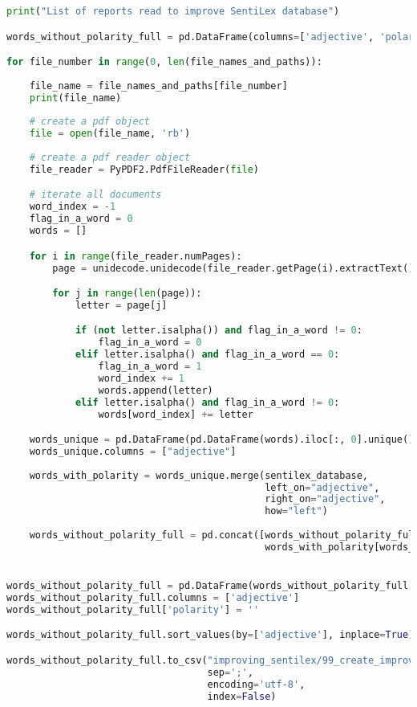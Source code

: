 \begin{lstlisting}[language=Python]
print("List of reports read to improve SentiLex database")

words_without_polarity_full = pd.DataFrame(columns=['adjective', 'polarity'])

for file_number in range(0, len(file_names_and_paths)):
    
    file_name = file_names_and_paths[file_number]
    print(file_name)
    
    # create a pdf object
    file = open(file_name, 'rb')
    
    # create a pdf reader object
    file_reader = PyPDF2.PdfFileReader(file)

    # iterate all documents
    word_index = -1
    flag_in_a_word = 0
    words = []

    for i in range(file_reader.numPages):
        page = unidecode.unidecode(file_reader.getPage(i).extractText().lower())

        for j in range(len(page)):
            letter = page[j]

            if (not letter.isalpha()) and flag_in_a_word != 0:
                flag_in_a_word = 0
            elif letter.isalpha() and flag_in_a_word == 0:
                flag_in_a_word = 1
                word_index += 1
                words.append(letter)
            elif letter.isalpha() and flag_in_a_word != 0:
                words[word_index] += letter

    words_unique = pd.DataFrame(pd.DataFrame(words).iloc[:, 0].unique())
    words_unique.columns = ["adjective"]
    
    words_with_polarity = words_unique.merge(sentilex_database,
                                             left_on="adjective",
                                             right_on="adjective",
                                             how="left")
    
    words_without_polarity_full = pd.concat([words_without_polarity_full,
                                             words_with_polarity[words_with_polarity.polarity.isnull()]])


words_without_polarity_full = pd.DataFrame(words_without_polarity_full.adjective.unique())
words_without_polarity_full.columns = ['adjective']
words_without_polarity_full['polarity'] = ''

words_without_polarity_full.sort_values(by=['adjective'], inplace=True)

words_without_polarity_full.to_csv("improving_sentilex/99_create_improving_sentilex.csv",
                                   sep=';',
                                   encoding='utf-8',
                                   index=False)
\end{lstlisting}
